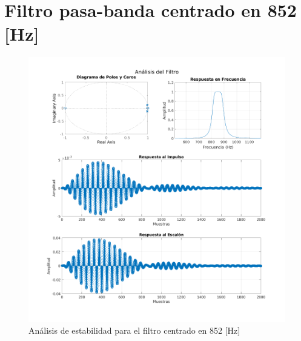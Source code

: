 \section{Filtro pasa-banda centrado en 852 [Hz]}
\begin{figure}[H]
  \centering
  \includegraphics[width=\linewidth]{images/simulacion/852.png}
  \caption{Análisis de estabilidad para el filtro centrado en 852 [Hz]}
  \label{fig:analisis_852}
\end{figure}

